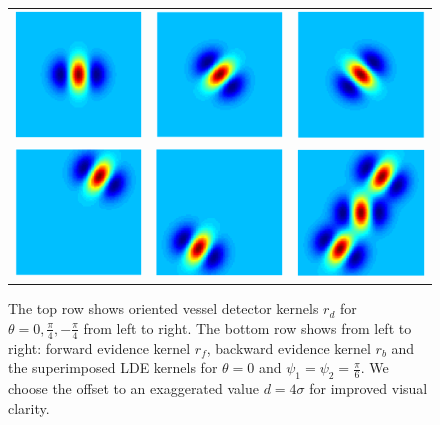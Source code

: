 \begin{figure}[t]
\centering
\renewcommand{\tabcolsep}{0.05cm}
	\begin{tabular}{@{}ccc @{}}
		\includegraphics[width=.25\linewidth]{./images/LDE/r_d} &
		\includegraphics[width=.25\linewidth]{./images/LDE/r_d_45} &
		\includegraphics[width=.255\linewidth]{./images/LDE/r_d_135} \\
		\includegraphics[width=.255\linewidth]{./images/LDE/r_f} &
		\includegraphics[width=.255\linewidth]{./images/LDE/r_b} &
		\includegraphics[width=.255\linewidth]{./images/LDE/all} \\
	\end{tabular}
\caption{The top row shows oriented vessel detector kernels $r_d$ for $\theta=0,\frac{\pi}{4},-\frac{\pi}{4}$	from left to right. The bottom row shows from left to right: forward evidence kernel $r_f$, backward evidence kernel $r_b$ and the superimposed LDE kernels for $\theta=0$ and $\psi_1=\psi_2=\frac{\pi}{6}$. We choose the offset to an exaggerated value $d=4\sigma$ for improved visual clarity.}
\label{fig:templates}
\end{figure}
